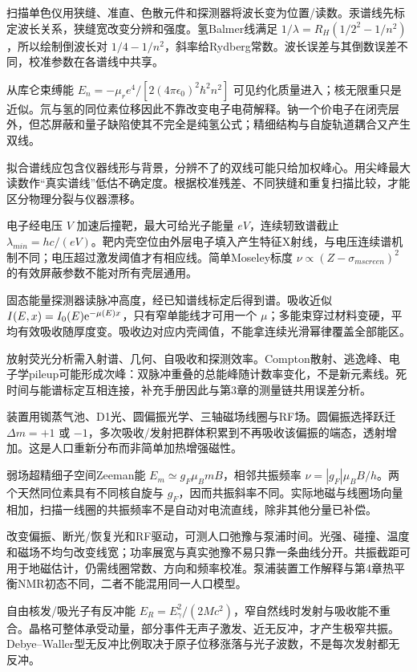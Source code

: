 扫描单色仪用狭缝、准直、色散元件和探测器将波长变为位置/读数。汞谱线先标定波长关系，狭缝宽改变分辨和强度。氢Balmer线满足 $1/\lambda=R_H(1/2^2-1/n^2)$，所以绘制倒波长对 $1/4-1/n^2$，斜率给Rydberg常数。波长误差与其倒数误差不同，校准参数在各谱线中共享。

从库仑束缚能 $E_n=-\mu_r e^4/[2(4\pi\epsilon_0)^2\hbar^2n^2]$ 可见约化质量进入；核无限重只是近似。氘与氢的同位素位移因此不靠改变电子电荷解释。钠一个价电子在闭壳层外，但芯屏蔽和量子缺陷使其不完全是纯氢公式；精细结构与自旋轨道耦合又产生双线。

拟合谱线应包含仪器线形与背景，分辨不了的双线可能只给加权峰心。用尖峰最大读数作“真实谱线”低估不确定度。根据校准残差、不同狭缝和重复扫描比较，才能区分物理分裂与仪器漂移。

电子经电压 $V$ 加速后撞靶，最大可给光子能量 $eV$，连续轫致谱截止 $\lambda_{min}=hc/(eV)$。靶内壳空位由外层电子填入产生特征X射线，与电压连续谱机制不同；电压超过激发阈值才有相应线。简单Moseley标度 $\nu\propto(Z-\sigma_{
m screen})^2$ 的有效屏蔽参数不能对所有壳层通用。

固态能量探测器读脉冲高度，经已知谱线标定后得到谱。吸收近似 $I(E,x)=I_0(E)\mathrm e^{-\mu(E)x}$，只有窄单能线才可用一个 $\mu$；多能束穿过材料变硬，平均有效吸收随厚度变。吸收边对应内壳阈值，不能拿连续光滑幂律覆盖全部能区。

放射荧光分析需入射谱、几何、自吸收和探测效率。Compton散射、逃逸峰、电子学pileup可能形成次峰：双脉冲重叠的总能峰随计数率变化，不是新元素线。死时间与能谱标定互相连接，补充手册因此与第3章的测量链共用误差分析。

装置用铷蒸气池、D1光、圆偏振光学、三轴磁场线圈与RF场。圆偏振选择跃迁 $\Delta m=+1$ 或 $-1$，多次吸收/发射把群体积累到不再吸收该偏振的端态，透射增加。这是人口重新分布而非简单加热增强磁性。

弱场超精细子空间Zeeman能 $E_m\simeq g_F\mu_BmB$，相邻共振频率 $\nu=|g_F|\mu_BB/h$。两个天然同位素具有不同核自旋与 $g_F$，因而共振斜率不同。实际地磁与线圈场向量相加，扫描一线圈的共振频率不是自动对电流直线，除非其他分量已补偿。

改变偏振、断光/恢复光和RF驱动，可测人口弛豫与泵浦时间。光强、碰撞、温度和磁场不均匀改变线宽；功率展宽与真实弛豫不易只靠一条曲线分开。共振截距可用于地磁估计，仍需线圈常数、方向和频率校准。泵浦装置工作解释与第4章热平衡NMR初态不同，二者不能混用同一人口模型。

自由核发/吸光子有反冲能 $E_R=E_\gamma^2/(2Mc^2)$，窄自然线时发射与吸收能不重合。晶格可整体承受动量，部分事件无声子激发、近无反冲，才产生极窄共振。Debye--Waller型无反冲比例取决于原子位移涨落与光子波数，不是每次发射都无反冲。

